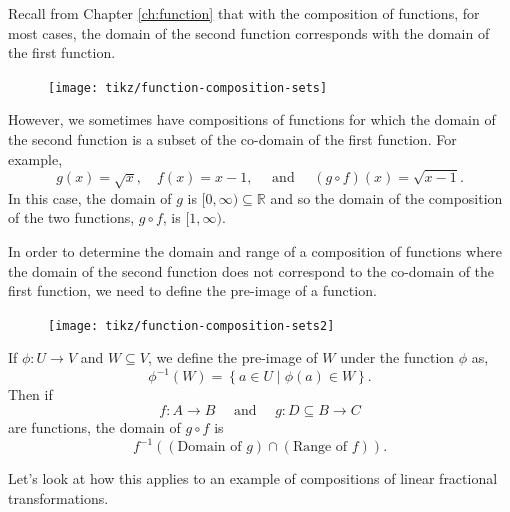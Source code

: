 \documentclass[
]{book}
\theoremstyle{definition}
\theoremstyle{definition}
\theoremstyle{definition}
\theoremstyle{definition}
\theoremstyle{remark}
\begin{document}
Recall from Chapter \ref{ch:function} that with the composition of functions, for most cases, the domain of the second function corresponds with the domain of the first function.

\begin{figure}

{\centering \texttt{[image: tikz/function-composition-sets]} 

}

\end{figure}

However, we sometimes have compositions of functions for which the domain of the second function is a subset of the co-domain of the first function. For example,
\[g(x) = \sqrt{x}, \quad f(x)=x-1, \quad \mbox{ and } \quad (g\circ f)(x) = \sqrt{x-1}.\]
In this case, the domain of \(g\) is \([0,\infty) \subseteq \mathbb{R}\) and so the domain of the composition of the two functions, \(g\circ f\), is \([1,\infty)\).

In order to determine the domain and range of a composition of functions where the domain of the second function does not correspond to the co-domain of the first function, we need to define the pre-image of a function.

\begin{figure}

{\centering \texttt{[image: tikz/function-composition-sets2]} 

}

\end{figure}

If \(\phi:U\rightarrow V\) and \(W \subseteq V\), we define the pre-image of \(W\) under the function \(\phi\) as,
\[\phi^{-1}(W) = \left\{ a\in U \middle \vert \phi(a)\in W\right\}.\] Then if \[f:A\rightarrow B \quad \mbox{ and } \quad g:D\subseteq B \rightarrow C\] are functions, the domain of \(g\circ f\) is \[f^{-1} \left( (\mbox{Domain of } g) \cap (\mbox{Range of } f)\right).\]

Let's look at how this applies to an example of compositions of linear fractional transformations.
\end{document}
